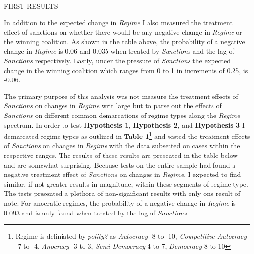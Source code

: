 \documentclass[a4paper]{article}\usepackage[]{graphicx}\usepackage[]{color}
\begin{document}
FIRST RESULTS 
\par
In addition to the expected change in \textit{Regime} I also measured the treatment effect of sanctions on whether there would be any negative change in \textit{Regime} or the winning coalition. As shown in the table above, the probability of a negative change in \textit{Regime} is 0.06 and 0.035 when treated by \textit{Sanctions} and the lag of \textit{Sanctions} respectively. Lastly, under the pressure of \textit{Sanctions} the expected change in the winning coalition which ranges from 0 to 1 in increments of 0.25, is -0.06. 
\par
The primary purpose of this analysis was not measure the treatment effects of \textit{Sanctions} on changes in \textit{Regime} writ large but to parse out the effects of \textit{Sanctions} on different common demarcations of regime types along the \textit{Regime} spectrum. In order to test \textbf{Hypothesis 1}, \textbf{Hypothesis 2}, and \textbf{Hypothesis 3} I demarcated regime types as outlined in \textbf{Table 1}\footnote{Regime is deliniated by \textit{polity2} as \textit{Autocracy} -8 to -10, \textit{Competitive Autocracy} -7 to -4, \textit{Anocracy} -3 to 3, \textit{Semi-Democracy} 4 to 7, \textit{Democracy} 8 to 10} and tested the treatment effects of \textit{Sanctions} on changes in \textit{Regime} with the data subsetted on cases within the respective ranges. The results of these results are presented in the table below and are somewhat surprising. Because tests on the entire sample had found a negative treatment effect of \textit{Sanctions} on changes in \textit{Regime}, I expected to find similar, if not greater results in magnitude, within these segments of regime type. The tests presented a plethora of non-significant results with only one result of note. For anocratic regimes, the probability of a negative change in \textit{Regime} is 0.093 and is only found when treated by the lag of \textit{Sanctions}.
\par
\end{document}

